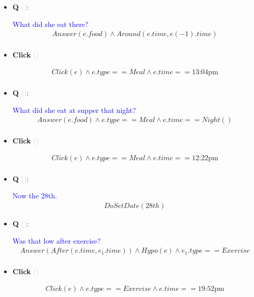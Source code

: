 \documentclass[11pt]{article}
\newcounter{CQ}
\newcounter{CClick}
\newcommand{\key}[1]{\textcolor{lightgray}{#1}}
\begin{document}
\begin{itemize}
	
	\item
	\textbf{Q\theCQ} \key{()}: \addtocounter{CQ}{1}
	\textcolor{blue}{ What did she eat there? }
	\begin{multline*}
	Answer(e.food) \wedge Around(e.time, e(-1).time) \\
	\end{multline*}
	
	
	\item
	\textbf{Click\theCClick} \key{()} \addtocounter{CClick}{1}
	\begin{multline*}
	Click(e) \wedge e.type == Meal \wedge e.time == \mbox{13:04pm}  \\
	\end{multline*}
	
	
	\item
	\textbf{Q\theCQ} \key{()}: \addtocounter{CQ}{1}
	\textcolor{blue}{ What did she eat at supper that night? }
	\begin{multline*}
	Answer(e.food) \wedge e.type == Meal \wedge e.time==Night() \\
	\end{multline*}
	
	
	
	\item
	\textbf{Click\theCClick} \key{()} \addtocounter{CClick}{1}
	\begin{multline*}
	Click(e) \wedge e.type == Meal \wedge e.time == \mbox{12:22pm} \\
	\end{multline*}
	
	
	\item
	\textbf{Q\theCQ} \key{()}: \addtocounter{CQ}{1}
	\textcolor{blue}{ Now the 28th. }
	\begin{multline*}
	DoSetDate(28th) 
	\end{multline*}
	
	
	\item
	\textbf{Q\theCQ} \key{()}: \addtocounter{CQ}{1}
	\textcolor{blue}{ Was that low after exercise? }
	\begin{multline*}
	Answer(After(e.time, e_1.time)) \wedge Hypo(e) \wedge e_1.type == Exercise  \\
	\end{multline*}
	
	
	\item
	\textbf{Click\theCClick} \key{()} \addtocounter{CClick}{1}
	\begin{multline*}
	Click(e) \wedge e.type == Exercise \wedge e.time == \mbox{19:52pm} \\
	\end{multline*}
	

\end{itemize}
\end{document}
